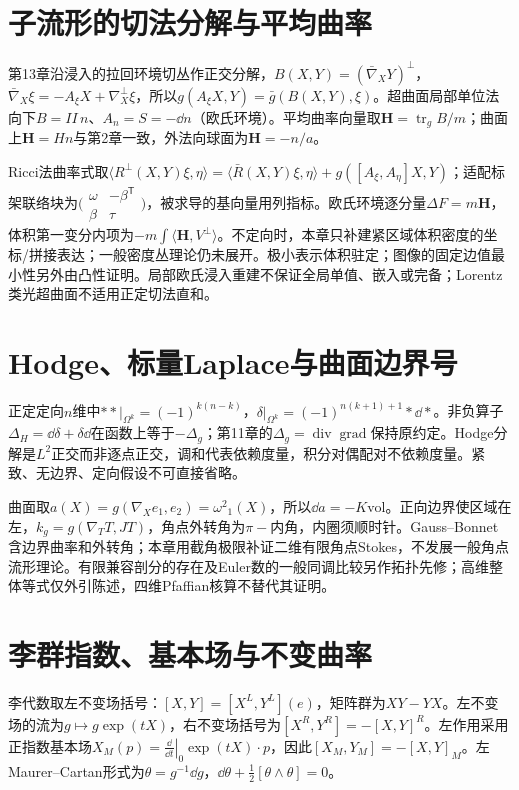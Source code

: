 \section{子流形的切法分解与平均曲率}
第13章沿浸入的拉回环境切丛作正交分解，$B(X,Y)=(\bar\nabla_XY)^\perp$，$\bar\nabla_X\xi=-A_\xi X+\nabla_X^\perp\xi$，所以$g(A_\xi X,Y)=\bar g(B(X,Y),\xi)$。超曲面局部单位法向下$B=II\,n$、$A_n=S=-\dd n$（欧氏环境）。平均曲率向量取$\mathbf H=\operatorname{tr}_gB/m$；曲面上$\mathbf H=Hn$与第2章一致，外法向球面为$\mathbf H=-n/a$。

Ricci法曲率式取$\langle R^\perp(X,Y)\xi,\eta\rangle=\langle\bar R(X,Y)\xi,\eta\rangle+g([A_\xi,A_\eta]X,Y)$；适配标架联络块为$\bigl(\begin{smallmatrix}\omega&-\beta^{\mathsf T}\\\beta&\tau\end{smallmatrix}\bigr)$，被求导的基向量用列指标。欧氏环境逐分量$\Delta F=m\mathbf H$，体积第一变分内项为$-m\int\langle\mathbf H,V^\perp\rangle$。不定向时，本章只补建紧区域体积密度的坐标/拼接表达；一般密度丛理论仍未展开。极小表示体积驻定；图像的固定边值最小性另外由凸性证明。局部欧氏浸入重建不保证全局单值、嵌入或完备；Lorentz类光超曲面不适用正定切法直和。


\section{Hodge、标量Laplace与曲面边界号}
正定定向$n$维中$**|_{\Omega^k}=(-1)^{k(n-k)}$，$\delta|_{\Omega^k}=(-1)^{n(k+1)+1}*\dd*$。非负算子$\Delta_H=\dd\delta+\delta\dd$在函数上等于$-\Delta_g$；第11章的$\Delta_g=\operatorname{div}\operatorname{grad}$保持原约定。Hodge分解是$L^2$正交而非逐点正交，调和代表依赖度量，积分对偶配对不依赖度量。紧致、无边界、定向假设不可直接省略。

曲面取$a(X)=g(\nabla_Xe_1,e_2)=\omega^2{}_1(X)$，所以$\dd a=-K\mathrm{vol}$。正向边界使区域在左，$k_g=g(\nabla_TT,JT)$，角点外转角为$\pi-$内角，内圈须顺时针。Gauss--Bonnet含边界曲率和外转角；本章用截角极限补证二维有限角点Stokes，不发展一般角点流形理论。有限兼容剖分的存在及Euler数的一般同调比较另作拓扑先修；高维整体等式仅外引陈述，四维Pfaffian核算不替代其证明。


\section{李群指数、基本场与不变曲率}
李代数取左不变场括号：$[X,Y]=[X^L,Y^L](e)$，矩阵群为$XY-YX$。左不变场的流为$g\mapsto g\exp(tX)$，右不变场括号为$[X^R,Y^R]=-[X,Y]^R$。左作用采用正指数基本场$X_M(p)=\left.\frac{\dd}{\dd t}\right|_0\exp(tX)\cdot p$，因此$[X_M,Y_M]=-[X,Y]_M$。左Maurer--Cartan形式为$\theta=g^{-1}\dd g$，$\dd\theta+\frac12[\theta\wedge\theta]=0$。


